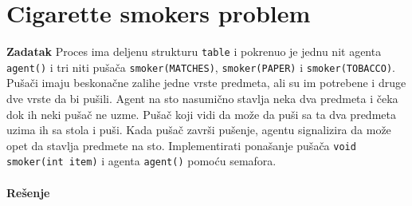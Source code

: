 \clearpage
\section{\latin Cigarette smokers problem}
\textbf{\large Zadatak} Proces ima deljenu strukturu \texttt{table} i pokrenuo je jednu nit agenta \texttt{agent()} i tri niti pu\v{s}a\v{c}a \texttt{smoker(MATCHES)}, \texttt{smoker(PAPER)} i \texttt{smoker(TOBACCO)}. Pu\v{s}a\v{c}i imaju beskona\v{c}ne zalihe jedne vrste predmeta, ali su im potrebene i druge dve vrste da bi pu\v{s}ili. Agent na sto nasumi\v{c}no stavlja neka dva  predmeta i \v{c}eka dok ih neki pu\v{s}a\v{c} ne uzme. Pu\v{s}a\v{c} koji vidi da mo\v{z}e da pu\v{s}i sa ta dva predmeta uzima ih sa stola i pu\v{s}i. Kada pu\v{s}a\v{c} zavr\v{s}i pu\v{s}enje, agentu signalizira da mo\v{z}e opet da stavlja predmete na sto. Implementirati pona\v{s}anje pu\v{s}a\v{c}a \texttt{void smoker(int item)} i agenta \texttt{agent()} pomo\'{c}u semafora.
\\\\
\textbf{\large Re\v{s}enje}
